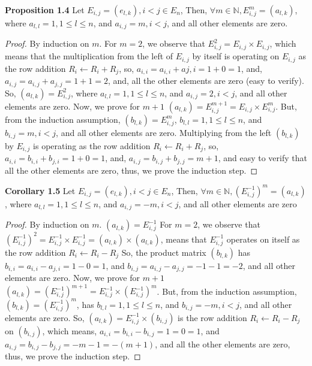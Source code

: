 \documentclass[12pt]{article}
\begin{document}
\textbf{Proposition 1.4} \newline
Let $E_{i,j}=(e_{l,k}),i<j \in E_n$, Then,\newline
$\forall m \in \mathbb{N},E_{i,j}^m=(a_{l,k})$, where $a_{l,l}=1,1 \leq l \leq n$, and $a_{i,j}=m,i<j$, and all other elements are zero.
\begin{proof}
By induction on $m$. \newline
For $m=2$, we observe that $E_{i,j}^2=E_{i,j} \times E_{i,j}$, which means that the multiplication from the left of $E_{i,j}$ by itself is operating on $E_{i,j}$ as the row addition $R_i \leftarrow R_i+R_j$, so, $a_{i,i}=a_{i,i}+a{j,i}=1+0=1$, and, $a_{i,j}=a_{i,j}+a_{j,j}=1+1=2$, and, all the other elements are zero (easy to verify). \newline 
So, $(a_{l,k})=E_{i,j}^2$, where $a_{l,l}=1,1 \leq l \leq n$, and $a_{i,j}=2,i<j$, and all other elements are zero. \newline
Now, we prove for $m+1$ \newline
$(a_{l,k})=E_{i,j}^{m+1}=E_{i,j} \times E_{i,j}^m$. But, from the induction assumption, $(b_{l,k})=E_{i,j}^m$, $b_{l,l}=1,1 \leq l \leq n$, and $b_{i,j}=m,i<j$, and all other elements are zero. \newline
Multiplying from the left $(b_{l,k})$ by $E_{i,j}$ is operating as the row addition $R_i \leftarrow R_i+R_j$, so, $a_{i,i}=b_{i,i}+b_{j,i}=1+0=1$, and, $a_{i,j}=b_{i,j}+b_{j,j}=m+1$, and easy to verify that all the other elements are zero, thus, we prove the induction step. \newline
\end{proof}
\newpage
\textbf{Corollary 1.5} \newline
Let $E_{i,j}=(e_{l,k}),i<j \in E_n$, Then,\newline
$\forall m \in \mathbb{N},(E_{i,j}^{-1})^m=(a_{l,k})$, where $a_{l,l}=1,1 \leq l \leq n$, and $a_{i,j}=-m,i<j$, and all other elements are zero
\begin{proof}
By induction on $m$. \newline
$(a_{l,k})=E_{i,j}^{-1}$
For $m=2$, we observe that $(E_{i,j}^{-1})^2=E_{i,j}^{-1} \times E_{i,j}^{-1}=(a_{l,k}) \times (a_{l,k})$, means that $E_{i,j}^{-1}$ operates on itself as the row addition $R_i \leftarrow R_i-R_j$ \newline
So, the product matrix $(b_{l,k})$ has $b_{i,i}=a_{i,i}-a_{j,i}=1-0=1$, and $b_{i,j}=a_{i,j}-a_{j,j}=-1-1=-2$, and all other elements are zero. \newline
Now, we prove for $m+1$ \newline
$(a_{l,k})=(E_{i,j}^{-1})^{m+1}=E_{i,j}^{-1} \times (E_{i,j}^{-1})^m$. But, from the induction assumption, $(b_{l,k})=(E_{i,j}^{-1})^m$, has $b_{l,l}=1,1 \leq l \leq n$, and $b_{i,j}=-m,i<j$, and all other elements are zero. \newline
So, $(a_{l,k})=E_{i,j}^{-1} \times (b_{i,j})$ is the row addition $R_i \leftarrow R_i-R_j$ on $(b_{i,j})$, which means, $a_{i,i}=b_{i,i}-b_{i,j}=1=0=1$, and $a_{i,j}=b_{i,j}-b_{j,j}=-m-1=-(m+1)$, and all the other elements are zero, thus, we prove the induction step. \newline
\end{proof}
\end{document}
